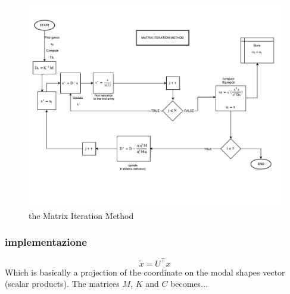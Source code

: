 \documentclass[twosided,a4paper]{article}           %
\newcommand{\tr}{^{{\bm \top}}}
\begin{document}
	
	
	\begin{figure}[H]
		\centering
		\includegraphics[width=\linewidth]{img/mim}
		\caption{the Matrix Iteration Method}
		\label{fig:mim}
	\end{figure}
	
	\subsubsection{implementazione}




\begin{equation}
	\tilde{x} = U\tr x 
\end{equation}
 Which is basically a projection of the coordinate on the modal shapes vector (scalar products).
 The matrices $M$, $K$ and $C$ becomes... %
%





\end{document}
